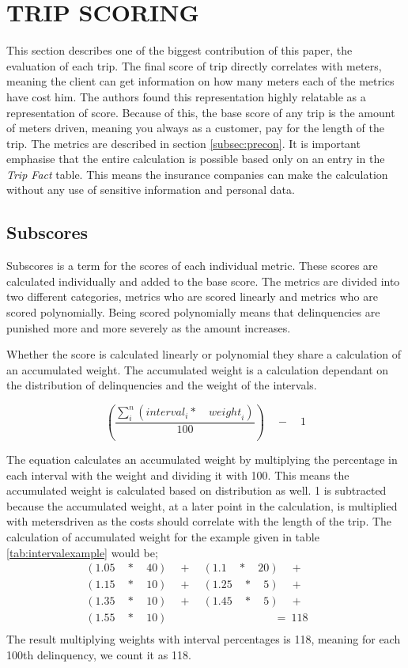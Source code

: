 \section{TRIP SCORING}\label{sec:trip}

This section describes one of the biggest contribution of this paper, the evaluation of each trip. The final score of trip directly correlates with meters, meaning the client can get information on how many meters each of the metrics have cost him. The authors found this representation highly relatable as a representation of score.
Because of this, the base score of any trip is the amount of meters driven, meaning you always as a customer, pay for the length of the trip. The metrics are described in section \ref{subsec:precon}.
It is important emphasise that the entire calculation is possible based only on an entry in the \textit{Trip Fact} table. This means the insurance companies can make the calculation without any use of sensitive information and personal data.

\subsection{Subscores} 

Subscores is a term for the scores of each individual metric. These scores are calculated individually and added to the base score. The metrics are divided into two different categories, metrics who are scored linearly and metrics who are scored polynomially. Being scored polynomially means that delinquencies are punished more and more severely as the amount increases.

Whether the score is calculated linearly or polynomial they share a calculation of an accumulated weight. The accumulated weight is a calculation dependant on the distribution of delinquencies and the weight of the intervals.

$$
\left( \frac { \sum _{ i }^{ n }{ \left( { interval }_{ i }*\quad { weight }_{ i } \right)  }  }{ 100 }  \right) \quad -\quad 1
$$

The equation calculates an accumulated weight by multiplying the percentage in each interval with the weight and dividing it with 100. This means the accumulated weight is calculated based on distribution as well. 1 is subtracted because the accumulated weight, at a later point in the calculation, is multiplied with metersdriven as the costs should correlate with the length of the trip. The calculation of accumulated weight for the example given in table \ref{tab:intervalexample} would be;
\begin{align*}
(1.05\quad *\quad 40)\quad +\quad (1.1\quad *\quad 20)\quad +\quad \quad \\ 
  (1.15\quad *\quad 10)\quad +\quad (1.25\quad *\quad 5)\quad +\quad \quad \\
  (1.35\quad *\quad 10)\quad +\quad (1.45\quad *\quad 5)\quad +\quad \quad \\
  (1.55\quad *\quad 10)\quad \quad \quad \quad \quad \quad \quad \quad \ \ \ \quad =\ 118 \\
\end{align*}
The result multiplying weights with interval percentages is 118, meaning for each 100th delinquency, we count it as 118.

